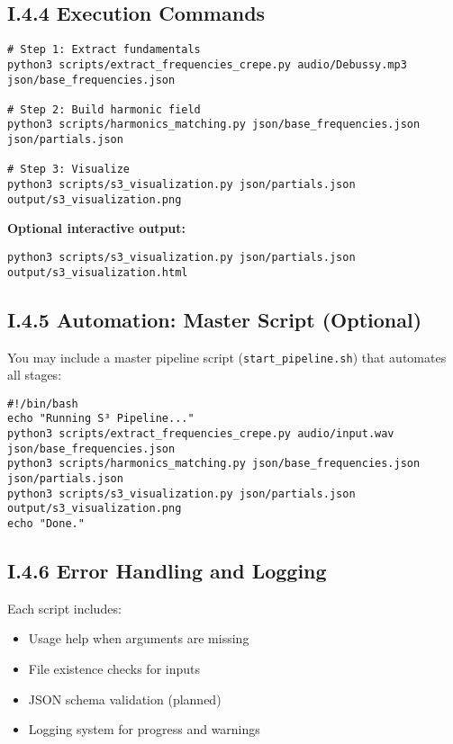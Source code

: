 \subsection*{I.4.4 Execution Commands}

\begin{verbatim}
# Step 1: Extract fundamentals
python3 scripts/extract_frequencies_crepe.py audio/Debussy.mp3 json/base_frequencies.json

# Step 2: Build harmonic field
python3 scripts/harmonics_matching.py json/base_frequencies.json json/partials.json

# Step 3: Visualize
python3 scripts/s3_visualization.py json/partials.json output/s3_visualization.png
\end{verbatim}

\textbf{Optional interactive output:}

\begin{verbatim}
python3 scripts/s3_visualization.py json/partials.json output/s3_visualization.html
\end{verbatim}

\subsection*{I.4.5 Automation: Master Script (Optional)}

You may include a master pipeline script (\texttt{start\_pipeline.sh}) that automates all stages:

\begin{verbatim}
#!/bin/bash
echo "Running S³ Pipeline..."
python3 scripts/extract_frequencies_crepe.py audio/input.wav json/base_frequencies.json
python3 scripts/harmonics_matching.py json/base_frequencies.json json/partials.json
python3 scripts/s3_visualization.py json/partials.json output/s3_visualization.png
echo "Done."
\end{verbatim}

\subsection*{I.4.6 Error Handling and Logging}

Each script includes:

\begin{itemize}
    \item Usage help when arguments are missing
    \item File existence checks for inputs
    \item JSON schema validation (planned)
    \item Logging system for progress and warnings
\end{itemize}

